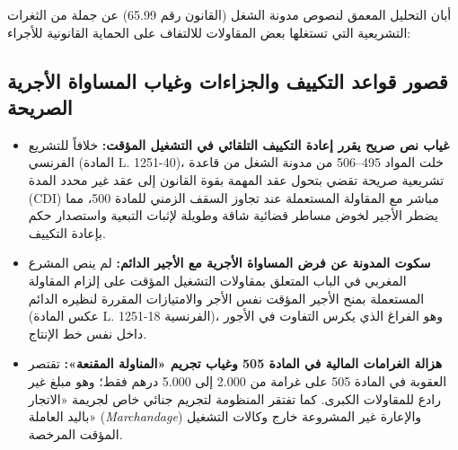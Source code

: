 أبان التحليل المعمق لنصوص مدونة الشغل (القانون رقم \textenglish{65.99}) عن جملة من الثغرات التشريعية التي تستغلها بعض المقاولات للالتفاف على الحماية القانونية للأجراء:

\subsection{قصور قواعد التكييف والجزاءات وغياب المساواة الأجرية الصريحة}
\begin{itemize}[leftmargin=*, itemsep=6pt]
    \item \textbf{غياب نص صريح يقرر إعادة التكييف التلقائي في التشغيل المؤقت:} خلافاً للتشريع الفرنسي (المادة \textenglish{L. 1251-40})، خلت المواد \textenglish{495}--\textenglish{506} من مدونة الشغل من قاعدة تشريعية صريحة تقضي بتحول عقد المهمة بقوة القانون إلى عقد غير محدد المدة (\textenglish{CDI}) مباشر مع المقاولة المستعملة عند تجاوز السقف الزمني للمادة \textenglish{500}، مما يضطر الأجير لخوض مساطر قضائية شاقة وطويلة لإثبات التبعية واستصدار حكم بإعادة التكييف.
    \item \textbf{سكوت المدونة عن فرض المساواة الأجرية مع الأجير الدائم:} لم ينص المشرع المغربي في الباب المتعلق بمقاولات التشغيل المؤقت على إلزام المقاولة المستعملة بمنح الأجير المؤقت نفس الأجر والامتيازات المقررة لنظيره الدائم (عكس المادة \textenglish{L. 1251-18} الفرنسية)، وهو الفراغ الذي يكرس التفاوت في الأجور داخل نفس خط الإنتاج.
    \item \textbf{هزالة الغرامات المالية في المادة \textenglish{505} وغياب تجريم «المناولة المقنعة»:} تقتصر العقوبة في المادة \textenglish{505} على غرامة من \textenglish{2.000} إلى \textenglish{5.000} درهم فقط؛ وهو مبلغ غير رادع للمقاولات الكبرى. كما تفتقر المنظومة لتجريم جنائي خاص لجريمة «الاتجار باليد العاملة» (\textit{Marchandage}) والإعارة غير المشروعة خارج وكالات التشغيل المؤقت المرخصة.
\end{itemize}

